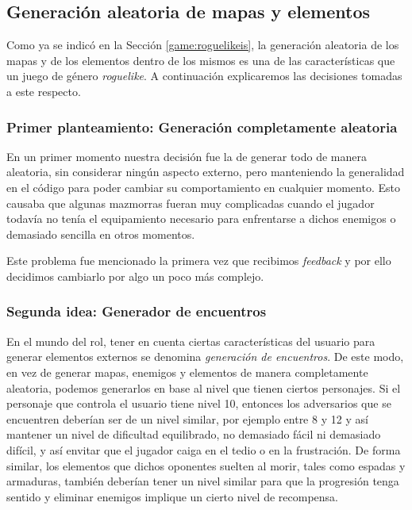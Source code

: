 \subsection{Generación aleatoria de mapas y elementos}

Como ya se indicó en la Sección \ref{game:roguelikeis}, la generación aleatoria de los mapas y de los elementos dentro de los mismos es una de las características que un juego de género \textit{roguelike}. A continuación explicaremos las decisiones tomadas a este respecto.

\subsubsection{Primer planteamiento: Generación completamente aleatoria}

En un primer momento nuestra decisión fue la de generar todo de manera aleatoria, sin considerar ningún aspecto externo, pero manteniendo la generalidad en el código para poder cambiar su comportamiento en cualquier momento. Esto causaba que algunas mazmorras fueran muy complicadas cuando el jugador todavía no tenía el equipamiento necesario para enfrentarse a dichos enemigos o demasiado sencilla en otros momentos.

Este problema fue mencionado la primera vez que recibimos \textit{feedback} y por ello decidimos cambiarlo por algo un poco más complejo.

\subsubsection{Segunda idea: Generador de encuentros}
\label{generadorencuentros}

En el mundo del rol, tener en cuenta ciertas características del usuario para generar elementos externos se denomina \textit{generación de encuentros}. De este modo, en vez de generar mapas, enemigos y elementos de manera completamente aleatoria, podemos generarlos en base al nivel que tienen ciertos personajes. Si el personaje que controla el usuario tiene nivel 10, entonces los adversarios que se encuentren deberían ser de un nivel similar, por ejemplo entre 8 y 12 y así mantener un nivel de dificultad equilibrado, no demasiado fácil ni demasiado difícil, y así envitar que el jugador caiga en el tedio o en la frustración. De forma similar, los elementos que dichos oponentes suelten al morir, tales como espadas y armaduras, también deberían tener un nivel similar para que la progresión tenga sentido y eliminar enemigos implique un cierto nivel de recompensa.

